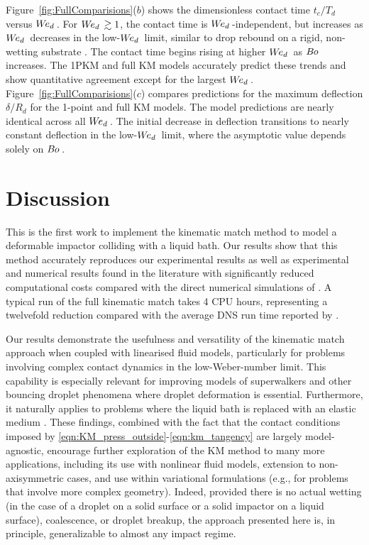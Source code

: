 \documentclass{jfm}
\newcommand{\Bo}{B\kern-0.04em o\,}
\newcommand{\Wed}{W\kern-0.15em e _d\,}
\begin{document}
Figure~\ref{fig:FullComparisions}($b$) shows the dimensionless contact time $t_{c} / T_{d}$ versus $\Wed$. For $\Wed \gtrsim 1$, the contact time is $\Wed$-independent, but increases as $\Wed$ decreases in the low-$\Wed$ limit, similar to drop rebound on a rigid, non-wetting substrate \citep{GabbardEtAl2025}. The contact time begins rising at higher $\Wed$ as $\Bo$ increases. The 1PKM and full KM models accurately predict these trends and show quantitative agreement except for the largest $\Wed$.  Figure~\ref{fig:FullComparisions}($c$) compares predictions for the maximum deflection $\delta / R_{d}$ for the 1-point and full KM models. The model predictions are nearly identical across all $\Wed$. The initial decrease in deflection transitions to nearly constant deflection in the low-$\Wed$ limit, where the asymptotic value depends solely on $\Bo$. 

\section{Discussion}\label{sec:Discussion}
This is the first work to implement the kinematic match method to model a deformable impactor colliding with a liquid bath. Our results show that this method accurately reproduces our experimental results as well as experimental and numerical results found in the literature with significantly reduced computational costs compared with the direct numerical simulations of \citet{AlventosaEtAl2023}. A typical run of the full kinematic match takes 4 CPU hours, representing a twelvefold reduction compared with the average DNS run time reported by \cite{AlventosaEtAl2023}. 

Our results demonstrate the usefulness and versatility of the kinematic match approach when coupled with linearised fluid models, particularly for problems involving complex contact dynamics in the low-Weber-number limit. This capability is especially relevant for improving models of superwalkers \citep{ValaniEtAl2019} and other bouncing droplet phenomena where droplet deformation is essential. Furthermore, it naturally applies to problems where the liquid bath is replaced with an elastic medium \citep{AgueroEtAl2022}. These findings, combined with the fact that the contact conditions imposed by \eqref{eqn:KM_press_outside}-\eqref{eqn:km_tangency} are largely model-agnostic, encourage further exploration of the KM method to many more applications, including its use with nonlinear fluid models, extension to non-axisymmetric cases, and use within variational formulations (e.g., for problems that involve more complex geometry). Indeed, provided there is no actual wetting (in the case of a droplet on a solid surface or a solid impactor on a liquid surface), coalescence, or droplet breakup, the approach presented here is, in principle, generalizable to almost any impact regime.
\end{document}
